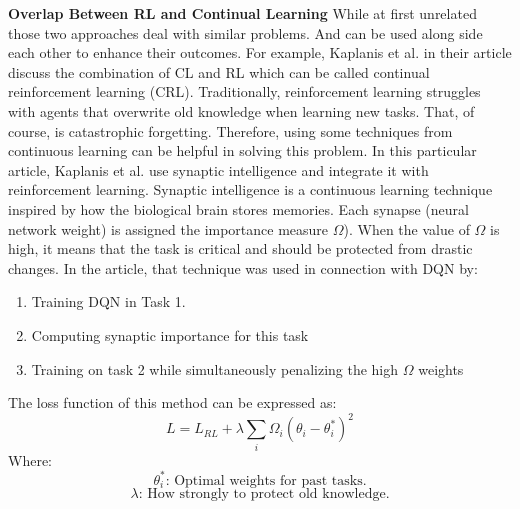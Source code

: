 \documentclass{IEEEcsmag}
\begin{document}
    \textbf{Overlap Between RL and Continual Learning}
    While at first unrelated those two approaches deal with similar problems. 
    And can be used along side each other to enhance their outcomes.
    For example, Kaplanis et al. \cite{cite-31} in their article discuss the combination of CL and RL which can be called continual reinforcement learning (CRL).
    Traditionally, reinforcement learning struggles with agents that overwrite old knowledge when learning new tasks.
    That, of course, is catastrophic forgetting. 
    Therefore, using some techniques from continuous learning can be helpful in solving this problem.
    In this particular article, Kaplanis et al. use synaptic intelligence and integrate it with reinforcement learning.
    Synaptic intelligence is a continuous learning technique inspired by how the biological brain stores memories.
    Each synapse (neural network weight) is assigned the importance measure $\Omega$). 
    When the value of $\Omega$ is high, it means that the task is critical and should be protected from drastic changes.
    In the article, that technique was used in connection with DQN by:
    \begin{enumerate}
        \item Training DQN in Task 1.
        \item Computing synaptic importance for this task
        \item Training on task 2 while simultaneously penalizing the high $\Omega$ weights
    \end{enumerate}
    The loss function of this method can be expressed as:
    \[
        L = L_{RL} +\lambda \sum_i \Omega_i(\theta_i - \theta^*_i)^2
    \]
    Where:
    \[
       \theta^*_i \text{: Optimal weights for past tasks.}
    \]
    \[
        \lambda \text{: How strongly to protect old knowledge.}
    \]
    
\end{document}

